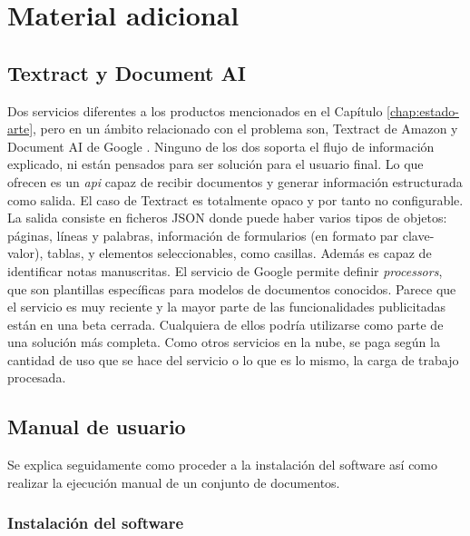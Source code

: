 
\chapter{Material adicional}
\label{chap:material-adicional}

\section{Textract y Document AI}
\label{sec:textract-y-document-ai}

Dos servicios diferentes a los productos mencionados en el Capítulo \ref{chap:estado-arte}, pero en un ámbito relacionado con el problema son, Textract de Amazon \cite{solucionesComerciales_amazon_textract} y Document AI de Google \cite{solucionesComerciales_google_documentAI}. Ninguno de los dos soporta el flujo de información explicado, ni están pensados para ser solución para el usuario final. Lo que ofrecen es un \emph{\acrshort{api}} capaz de recibir documentos y generar información estructurada como salida. El caso de Textract es totalmente opaco y por tanto no configurable. La salida consiste en ficheros JSON donde puede haber varios tipos de objetos: páginas, líneas y palabras, información de formularios (en formato par clave-valor), tablas, y elementos seleccionables, como casillas. Además es capaz de identificar notas manuscritas. El servicio de Google permite definir \emph{processors}, que son plantillas específicas para modelos de documentos conocidos. Parece que el servicio es muy reciente y la mayor parte de las funcionalidades publicitadas están en una beta cerrada. Cualquiera de ellos podría utilizarse como parte de una solución más completa. Como otros servicios en la nube, se paga según la cantidad de uso que se hace del servicio o lo que es lo mismo, la carga de trabajo procesada.

\section{Manual de usuario}
\label{sec:instalacion-software}

Se explica seguidamente como proceder a la instalación del software así como realizar la ejecución manual de un conjunto de documentos.

\subsection{Instalación del software}

